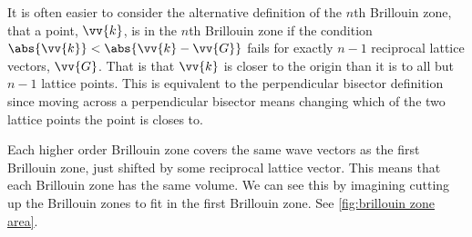 \documentclass[fleqn]{NotesClass}
\begin{document}
    It is often easier to consider the alternative definition of the \(n\)th Brillouin zone, that a point, \(\vv{k}\), is in the \(n\)th Brillouin zone if the condition \(\abs{\vv{k}} < \abs{\vv{k} - \vv{G}}\) fails for exactly \(n - 1\) reciprocal lattice vectors, \(\vv{G}\).
    That is that \(\vv{k}\) is closer to the origin than it is to all but \(n - 1\) lattice points.
    This is equivalent to the perpendicular bisector definition since moving across a perpendicular bisector means changing which of the two lattice points the point is closes to.
    
    Each higher order Brillouin zone covers the same wave vectors as the first Brillouin zone, just shifted by some reciprocal lattice vector.
    This means that each Brillouin zone has the same volume.
    We can see this by imagining cutting up the Brillouin zones to fit in the first Brillouin zone.
    See \cref{fig:brillouin zone area}.
    
\end{document}
